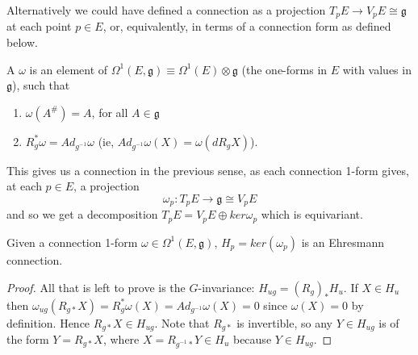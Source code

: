 

Alternatively we could have defined a connection as a projection $T_p E\rightarrow V_p E\cong \mathfrak{g}$ at each point $p\in E$, or, equivalently, in terms of a connection form as defined below.

\begin{definition}
A  $\omega$ is an element of $\Omega^1(E,\mathfrak{g})\equiv\Omega^1(E)\otimes \mathfrak{g}$ (the one-forms in $E$ with values in $\mathfrak{g}$), such that \begin{enumerate}
                                                                                                                                                                                         \item $\omega(A^\#)=A$, for all $A\in \mathfrak{g}$
							\item $R_g^*\omega=Ad_{g^{-1}}\omega$ (ie, $Ad_{g^{-1}}\omega(X)=\omega(d R_g X)$).
							\end{enumerate}
\end{definition}

This gives us a connection in the previous sense, as each connection 1-form gives, at each $p\in E$, a projection \[
                                                                                                              \omega_p:T_p E\rightarrow \mathfrak{g}\cong V_p E
                                                                                                             \]
and so we get a decomposition $T_p E=V_p E\oplus ker\omega_p$ which is equivariant.

\begin{prop} Given a connection 1-form $\omega\in\Omega^1(E,\mathfrak{g})$, $H_p=ker(\omega_p)$ is an Ehresmann connection.
\end{prop}

\begin{proof}
All that is left to prove is the $G$-invariance: $H_{ug}=(R_{g})_* H_u$. If $X\in H_u$ then $\omega_{ug}(R_{g*}X)=R_g^*\omega(X)=Ad_{g^{-1}}\omega(X)=0$ since $\omega(X)=0$ by definition. Hence $R_{g*}X\in H_{ug}$. Note that $R_{g*}$ is invertible, so any $Y\in H_{ug}$ is of the form $Y=R_{g*}X$, where $X=R_{g^{-1}*}Y\in H_u$ because $Y\in H_{ug}$.
\end{proof}

